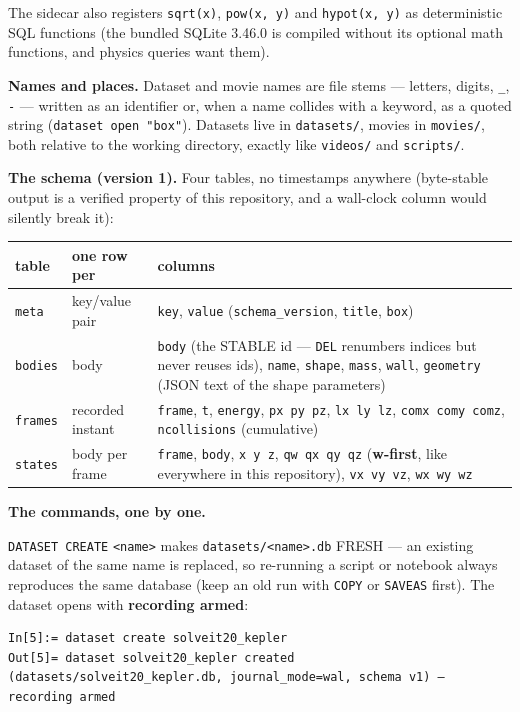 \documentclass[11pt]{article}
\newcommand{\kw}[1]{\texttt{\uppercase{#1}}}
\newcommand{\code}[1]{\texttt{#1}}
\begin{document}
The sidecar also registers \code{sqrt(x)}, \code{pow(x, y)} and
\code{hypot(x, y)} as deterministic SQL functions (the bundled SQLite
3.46.0 is compiled without its optional math functions, and physics
queries want them).

\textbf{Names and places.} Dataset and movie names are file stems ---
letters, digits, \code{\_}, \code{-} --- written as an identifier or,
when a name collides with a keyword, as a quoted string
(\code{dataset open "box"}). Datasets live in \code{datasets/}, movies
in \code{movies/}, both relative to the working directory, exactly
like \code{videos/} and \code{scripts/}.

\textbf{The schema (version 1).} Four tables, no timestamps anywhere
(byte-stable output is a verified property of this repository, and a
wall-clock column would silently break it):

\begin{center}\small
\begin{tabular}{llp{8.4cm}}
\textbf{table} & \textbf{one row per} & \textbf{columns}\\\hline
\code{meta} & key/value pair & \code{key}, \code{value}
  (\code{schema\_version}, \code{title}, \code{box})\\
\code{bodies} & body & \code{body} (the STABLE id --- \kw{del}
  renumbers indices but never reuses ids), \code{name}, \code{shape},
  \code{mass}, \code{wall}, \code{geometry} (JSON text of the shape
  parameters)\\
\code{frames} & recorded instant & \code{frame}, \code{t},
  \code{energy}, \code{px py pz}, \code{lx ly lz},
  \code{comx comy comz}, \code{ncollisions} (cumulative)\\
\code{states} & body per frame & \code{frame}, \code{body},
  \code{x y z}, \code{qw qx qy qz} (\textbf{w-first}, like everywhere
  in this repository), \code{vx vy vz}, \code{wx wy wz}\\
\end{tabular}
\end{center}

\textbf{The commands, one by one.}

\kw{dataset create} \code{<name>} makes \code{datasets/<name>.db}
FRESH --- an existing dataset of the same name is replaced, so
re-running a script or notebook always reproduces the same database
(keep an old run with \kw{copy} or \kw{saveas} first). The dataset
opens with \textbf{recording armed}:

\begin{lstlisting}
In[5]:= dataset create solveit20_kepler
Out[5]= dataset solveit20_kepler created (datasets/solveit20_kepler.db, journal_mode=wal, schema v1) — recording armed
\end{lstlisting}
\end{document}
